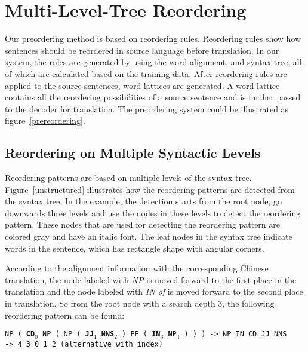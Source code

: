 \documentclass[a4paper]{article}
\begin{document}
\section{Multi-Level-Tree Reordering}

Our preordering method is based on reordering rules. Reordering rules show how sentences should be reordered in source language before translation. In our system, the rules are generated by using the word alignment, and syntax tree, all of which are calculated based on the training data. After reordering rules are applied to the source sentences, word lattices are generated. A word lattice contains all the reordering possibilities of a source sentence and is further passed to the decoder for translation. The preordering system could be illustrated as figure~\ref{prereordering}.

\begin{figure*}
\centering

\caption{Illustration of preordering system}
\label{prereordering}
\end{figure*}

\subsection{Reordering on Multiple Syntactic Levels}

Reordering patterns are based on multiple levels of the syntax tree. Figure~\ref{unstructured} illustrates how the reordering patterns are detected from the syntax tree. In the example, the detection starts from the root node, go downwards three levels and use the nodes in these levels to detect the reordering pattern. These nodes that are used for detecting the reordering pattern are colored gray and have an italic font. The leaf nodes in the syntax tree indicate words in the sentence, which has rectangle shape with angular corners.

According to the alignment information with the corresponding Chinese translation, the node labeled with \emph{NP} is moved forward to the first place in the translation and the node labeled with \emph{IN of} is moved forward to the second place in translation. So from the root node with a search depth $3$, the following reordering pattern can be found:\bigskip

\noindent \texttt{NP ( \textbf{CD}$_0$ NP ( NP ( \textbf{JJ}$_1$ \textbf{NNS}$_2$ ) PP ( \textbf{IN}$_3$ \textbf{NP}$_4$ ) ) ) -> NP IN CD JJ NNS}\medskip \\
\texttt{-> 4 3 0 1 2 (alternative with index)}\bigskip
\end{document}
